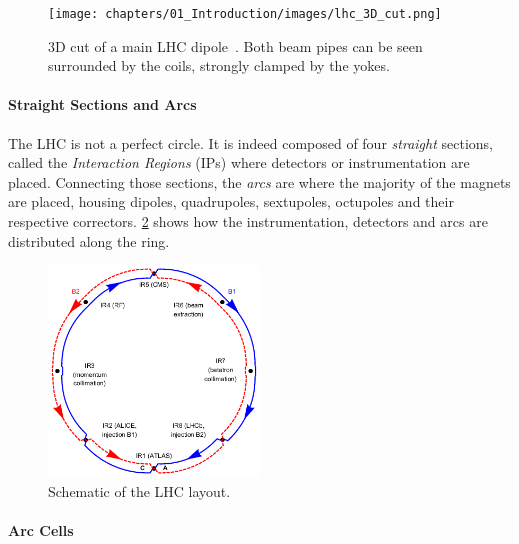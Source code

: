\begin{figure}[!htb]
    \texttt{[image: chapters/01\_Introduction/images/lhc\_3D\_cut.png]}
    \caption{3D cut of a main LHC dipole~\cite{noauthor_cern_nodate}. Both beam pipes can be seen
    surrounded by the coils, strongly clamped by the yokes.}
    \label{fig:3d_cut_dipole}
\end{figure}


\paragraph{Straight Sections and Arcs}
The LHC is not a perfect circle. It is indeed composed of four \textit{straight} sections, called
the \textit{Interaction Regions} (IPs) where detectors or instrumentation are placed. Connecting
those sections, the \textit{arcs} are where the majority of the magnets are placed, housing dipoles,
quadrupoles, sextupoles, octupoles and their respective correctors. \cref{fig:introduction:lhc_irs}
shows how the instrumentation, detectors and arcs are distributed along the ring.

\begin{figure}[!htb]
    \centering
    \includegraphics[width=0.5\textwidth]{./images/irs.png}
    \caption{Schematic of the LHC layout.}
    \label{fig:introduction:lhc_irs}
\end{figure}


\paragraph{Arc Cells}

